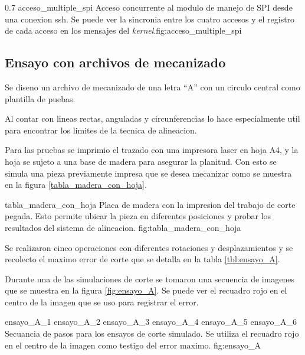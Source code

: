 \subfiga
{0.7} {acceso_multiple_spi} {Acceso concurrente al modulo de manejo de SPI desde una conexion ssh. Se puede ver la sincronia entre los cuatro accesos y el registro de cada acceso en los mensajes del \textit{kernel}.}{fig:acceso_multiple_spi}


\subsection{Ensayo con archivos de mecanizado}

Se diseno un archivo de mecanizado de una letra ``A'' con un circulo central como plantilla de puebas.\par
Al contar con lineas rectas, anguladas y circunferencias lo hace especialmente util para encontrar los limites de la tecnica de alineacion. \par
Para las pruebas se imprimio el trazado con una impresora laser en hoja A4, y la hoja se sujeto a una base de madera para asegurar la planitud. Con esto se simula una pieza previamente impresa que se desea mecanizar como se muestra en la figura \ref{tabla_madera_con_hoja}.\par

    {tabla_madera_con_hoja} {Placa de madera con la impresion del trabajo de corte pegada. Esto permite ubicar la pieza en diferentes posiciones y probar los resultados del sistema de alineacion.} {fig:tabla_madera_con_hoja}

   Se realizaron cinco operaciones con diferentes rotaciones y desplazamientos y se recolecto el maximo error de corte que se detalla en la tabla \ref{tbl:ensayo_A}.\par
   Durante una de las simulaciones de corte se tomaron una secuencia de imagenes que se muestra en la figura \ref{fig:ensayo_A}. Se puede ver el recuadro rojo en el centro de la imagen que se uso para registrar el error.\par

   \subfigthreethree
      {ensayo_A_1}
      {ensayo_A_2}
      {ensayo_A_3}
      {ensayo_A_4}
      {ensayo_A_5}
      {ensayo_A_6}
      {Secuancia de pasos para los ensayos de corte simulado. Se utiliza el recuadro rojo en el centro de la imagen como testigo del error maximo.}
      {fig:ensayo_A}

